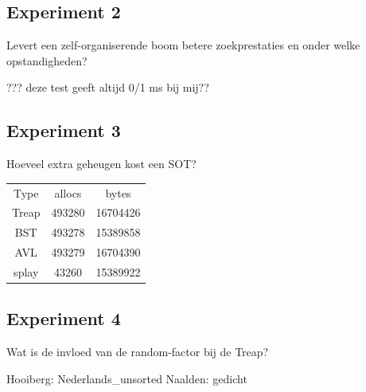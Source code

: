 \documentclass[a4paper,10pt]{article}
\begin{document}
\subsection{Experiment 2}
Levert een zelf-organiserende boom betere zoekprestaties en onder welke opstandigheden?

??? deze test geeft altijd 0/1 ms bij mij??

\subsection{Experiment 3}
Hoeveel extra geheugen kost een SOT?

\begin{center}
\begin{tabular}{c c c}
Type & allocs & bytes \\
Treap & 493280 & 16704426 \\
BST & 493278 & 15389858 \\
AVL & 493279 & 16704390 \\
splay & 43260 & 15389922 \\
\end{tabular}
\end{center}
\subsection{Experiment 4}
Wat is de invloed van de random-factor bij de Treap?

Hooiberg:
Nederlands\_unsorted
Naalden:
gedicht
\end{document}
